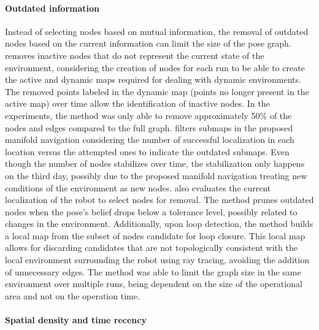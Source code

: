 \paragraph{Outdated information}

Instead of selecting nodes based on mutual information, the removal of outdated nodes based on the current information can limit the size of the pose graph.
\cite{walcott-bryant-et-al:2012:6385561} removes inactive nodes that do not represent the current state of the environment, considering the creation of nodes for each run to be able to create the active and dynamic maps required for dealing with dynamic environments. The removed points labeled in the dynamic map (points no longer present in the active map) over time allow the identification of inactive nodes. In the experiments, the method was only able to remove approximately 50\% of the nodes and edges compared to the full graph.
\cite{tang-et-al:2019:7} filters submaps in the proposed manifold navigation considering the number of successful localization in each location versus the attempted ones to indicate the outdated submaps. Even though the number of nodes stabilizes over time, the stabilization only happens on the third day, possibly due to the proposed manifold navigation treating new conditions of the environment as new nodes.
\cite{boniardi-et-al:2019:003} also evaluates the current localization of the robot to select nodes for removal. The method prunes outdated nodes when the pose's belief drops below a tolerance level, possibly related to changes in the environment. Additionally, upon loop detection, the method builds a local map from the subset of nodes candidate for loop closure. This local map allows for discarding candidates that are not topologically consistent with the local environment surrounding the robot using ray tracing, avoiding the addition of unnecessary edges. The method was able to limit the graph size in the same environment over multiple runs, being dependent on the size of the operational area and not on the operation time.


\paragraph{Spatial density and time recency}


